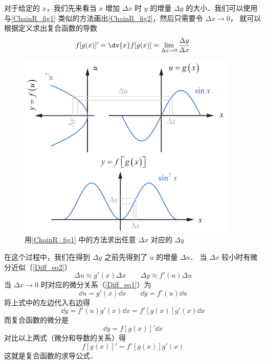 对于给定的 $x$，我们先来看当 $x$ 增加 $\Delta x$ 时 $y$ 的增量 $\Delta y$ 的大小．我们可以使用与\autoref{ChainR_fig1} 类似的方法画出\autoref{ChainR_fig2}，然后只需要令 $\Delta x \to 0$， 就可以根据定义求出复合函数的导数
\begin{equation}
f[g(x)]' = \dv{x} f[g(x)] = \lim_{\Delta x\to 0} \frac{\Delta y}{\Delta x}
\end{equation}

\begin{figure}[ht]
\centering
\includegraphics[width=10.5cm]{./figures/ChainR2.pdf}
\caption{用\autoref{ChainR_fig1} 中的方法求出任意 $\Delta x$ 对应的 $\Delta y$} \label{ChainR_fig2}
\end{figure}

在这个过程中，我们在得到 $\Delta y$ 之前先得到了 $u$ 的增量 $\Delta u$． 当 $\Delta x$ 较小时有微分近似（\autoref{Diff_eq2}）
\begin{equation}
\Delta {u} \approx g'(x) \Delta{x}
\qquad
\Delta{y} \approx f'(u) \Delta{u}
\end{equation}
当 $\Delta x \to 0$ 时对应的微分关系（\autoref{Diff_eq1}）为
\begin{equation}
\dd{u} = g'(x) \dd{x}
\qquad
\dd{y} = f'(u) \dd{u}
\end{equation}
将上式中的左边代入右边得
\begin{equation}
\dd{y} = f'(u) g'(x) \dd{x} = f'[g(x)]g'(x) \dd{x}
\end{equation}
而复合函数的微分是
\begin{equation}
\dd{y} = f[g(x)]' \dd{x}
\end{equation}
对比以上两式（微分和导数的关系）得
\begin{equation}\label{ChainR_eq4}
f[g(x)]' = f'[g(x)]g'(x)
\end{equation}
这就是复合函数的求导公式．

